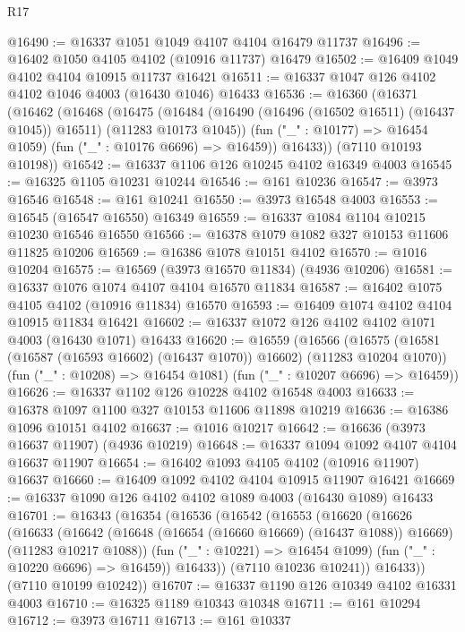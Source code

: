 \begin{lexlean}{R17}
\begin{coremodule}
@16490 := @16337 @1051 @1049 @4107 @4104 @16479 @11737
@16496 := @16402 @1050 @4105 @4102 (@10916 @11737) @16479
@16502 := @16409 @1049 @4102 @4104 @10915 @11737 @16421
@16511 := @16337 @1047 @126 @4102 @4102 @1046 @4003 (@16430 @1046) @16433
@16536 := @16360
    (@16371
      (@16462
        (@16468
          (@16475
            (@16484 (@16490 (@16496 (@16502 @16511) (@16437 @1045)) @16511) (@11283 @10173 @1045))
            (fun ("_" : @10177) => @16454 @1059)
            (fun ("_" : @10176 @6696) => @16459))
          @16433))
      (@7110 @10193 @10198))
@16542 := @16337 @1106 @126 @10245 @4102 @16349 @4003
@16545 := @16325 @1105 @10231 @10244
@16546 := @161 @10236
@16547 := @3973 @16546
@16548 := @161 @10241
@16550 := @3973 @16548 @4003
@16553 := @16545 (@16547 @16550) @16349
@16559 := @16337 @1084 @1104 @10215 @10230 @16546 @16550
@16566 := @16378 @1079 @1082 @327 @10153 @11606 @11825 @10206
@16569 := @16386 @1078 @10151 @4102
@16570 := @1016 @10204
@16575 := @16569 (@3973 @16570 @11834) (@4936 @10206)
@16581 := @16337 @1076 @1074 @4107 @4104 @16570 @11834
@16587 := @16402 @1075 @4105 @4102 (@10916 @11834) @16570
@16593 := @16409 @1074 @4102 @4104 @10915 @11834 @16421
@16602 := @16337 @1072 @126 @4102 @4102 @1071 @4003 (@16430 @1071) @16433
@16620 := @16559
    (@16566
      (@16575 (@16581 (@16587 (@16593 @16602) (@16437 @1070)) @16602) (@11283 @10204 @1070))
      (fun ("_" : @10208) => @16454 @1081)
      (fun ("_" : @10207 @6696) => @16459))
@16626 := @16337 @1102 @126 @10228 @4102 @16548 @4003
@16633 := @16378 @1097 @1100 @327 @10153 @11606 @11898 @10219
@16636 := @16386 @1096 @10151 @4102
@16637 := @1016 @10217
@16642 := @16636 (@3973 @16637 @11907) (@4936 @10219)
@16648 := @16337 @1094 @1092 @4107 @4104 @16637 @11907
@16654 := @16402 @1093 @4105 @4102 (@10916 @11907) @16637
@16660 := @16409 @1092 @4102 @4104 @10915 @11907 @16421
@16669 := @16337 @1090 @126 @4102 @4102 @1089 @4003 (@16430 @1089) @16433
@16701 := @16343
    (@16354
      (@16536
        (@16542
          (@16553
            (@16620
              (@16626
                (@16633
                  (@16642
                    (@16648 (@16654 (@16660 @16669) (@16437 @1088)) @16669)
                    (@11283 @10217 @1088))
                  (fun ("_" : @10221) => @16454 @1099)
                  (fun ("_" : @10220 @6696) => @16459))
                @16433))
            (@7110 @10236 @10241))
          @16433))
      (@7110 @10199 @10242))
@16707 := @16337 @1190 @126 @10349 @4102 @16331 @4003
@16710 := @16325 @1189 @10343 @10348
@16711 := @161 @10294
@16712 := @3973 @16711
@16713 := @161 @10337

\end{coremodule}
\end{lexlean}
